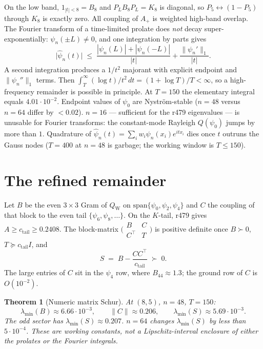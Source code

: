 \documentclass[11pt]{article}
\newtheorem{theorem}{Theorem}
\theoremstyle{remark}
\newcommand{\QW}{Q_{\mathrm W}}
\begin{document}
On the low band, $1_{|t|<8}=B_8$ and $P_LB_8P_L=K_8$ is
diagonal, so $P_5\leftrightarrow(1-P_5)$ through $K_8$ is
exactly zero.  All coupling of $A_+$ is weighted high-band
overlap.
The Fourier transform of a time-limited prolate does
\emph{not} decay super-exponentially:
$\psi_n(\pm L)\ne0$, and one integration by parts gives
\[
 \bigl|\widehat\psi_n(t)\bigr|
 \;\le\;
 \frac{|\psi_n(L)|+|\psi_n(-L)|}{|t|}
 +\frac{\|\psi_n'\|_1}{|t|}.
\]
A second integration produces a $1/t^2$ majorant with
explicit endpoint and $\|\psi_n''\|_1$ terms.
Then $\int_T^\infty(\log t)/t^2\,dt=(1+\log T)/T<\infty$,
so a high-frequency remainder is possible in principle.
At $T=150$ the elementary integral equals $4.01\cdot10^{-2}$.
Endpoint values of $\psi_0$ are Nystr\"om-stable
($n=48$ versus $n=64$ differ by $<0.02$).
$n=16$ --- sufficient for the r479 eigenvalues ---
is unusable for Fourier transforms:
the constant-mode Rayleigh $Q(\psi_0)$ jumps by more than $1$.
Quadrature of $\widehat\psi_n(t)=\sum_i w_i\psi_n(x_i)e^{itx_i}$
dies once $t$ outruns the Gauss nodes
($T=400$ at $n=48$ is garbage; the working window is $T\le150$).

\section{The refined remainder}

Let $B$ be the even $3\times3$ Gram of $\QW$ on
$\mathrm{span}\{\psi_0,\psi_2,\psi_4\}$ and $C$ the coupling
of that block to the even tail $\{\psi_6,\psi_8,\dots\}$.
On the $K$-tail, r479 gives $A\ge c_{\mathrm{tail}}\ge0.2408$.
The block-matrix
$\bigl(\begin{smallmatrix}B&C\\C^\top&T\end{smallmatrix}\bigr)$
is positive definite once $B\succ0$, $T\succeq c_{\mathrm{tail}}I$,
and
\[
 S \;=\; B-\frac{CC^\top}{c_{\mathrm{tail}}} \;\succ\;0.
\]
The large entries of $C$ sit in the $\psi_4$ row, where
$B_{44}\approx1.3$; the ground row of $C$ is $O(10^{-2})$.

\begin{theorem}[Numeric matrix Schur]\label{thm:schur}
At $(8,5)$, $n=48$, $T=150$:
\[
 \lambda_{\min}(B)\approx6.66\cdot10^{-3},\qquad
 \|C\|\approx0.206,\qquad
 \lambda_{\min}(S)\approx5.69\cdot10^{-3}.
\]
The odd sector has $\lambda_{\min}(S)\approx0.207$.
$n=64$ changes $\lambda_{\min}(S)$ by less than $5\cdot10^{-4}$.
These are working constants, not a Lipschitz-interval enclosure
of either the prolates or the Fourier integrals.
\end{theorem}
\end{document}
